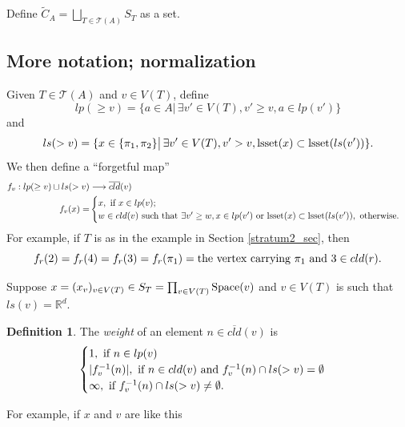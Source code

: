 \documentclass[11pt]{article}
\theoremstyle{definition}
\newtheorem{dfn}[thm]{Definition}
\theoremstyle{remark}
\def\wt#1{\widetilde{#1}}
\def\ov#1{\overline{#1}}
\def\R{\mathbb{R}}
\def\cT{\mathcal{T}}
\def\rI{{\mathring{I}}}
\def\tn#1{\textnormal{#1}}
\begin{document}
Define $\wt{C}_A=\bigsqcup_{T\in\cT(A)}S_T$ as a set. 

\subsection{More notation; normalization}
\label{normalization_subsec}

Given $T\in\cT(A)$ and $v\in V(T)$, define
$$lp(\ge v)=\{a\in A\big|\,\exists v'\in V(T),v'\ge v, a\in lp(v')\}$$
and 
$$ls(> v)=\{x\in\{\pi_1,\pi_2\}\big|\, \exists v'\in V(T), v'>v, \tn{lsset}(x)\subset\tn{lsset}(ls(v'))\}.$$
We then define a ``forgetful map'' 
\begin{align*}
f_v:lp(\ge v)\sqcup ls(>v)&\longrightarrow \ov{cld}(v)\\
f_v(x)=&\begin{cases}x, \tn{ if }x\in lp(v);\\ w\in cld(v) \tn{ such that }\exists v'\ge w, x\in lp(v') \tn{ or }\tn{lsset}(x)\subset\tn{lsset}(ls(v')), \tn{ otherwise}.\end{cases}
\end{align*}
For example, if $T$ is as in the example in Section \ref{stratum2_sec}, then 
$$f_r(2)=f_r(4)=f_r(3)=f_r(\pi_1)=\tn{the vertex carrying }\pi_1 \tn{ and } 3\in cld(r).$$



Suppose $x=(x_v)_{v\in V(T)}\in S_T=\prod_{v\in V(T)}\tn{Space}(v)$ and $v\in V(T)$ is such that $ls(v)=\R^d$. 

\begin{dfn}
The {\it weight} of an element $n\in \ov{cld}(v)$ is 
$$\begin{cases}
1,\tn{ if }n\in lp(v)\\
|f_v^{-1}(n)|, \tn{ if }n\in cld(v) \tn{ and } f_v^{-1}(n)\cap ls(>v)=\emptyset\\
\infty, \tn{ if }f_v^{-1}(n)\cap ls(>v)\neq\emptyset.
\end{cases}$$
\end{dfn}
For example, if $x$ and $v$ are like this 
\end{document}
